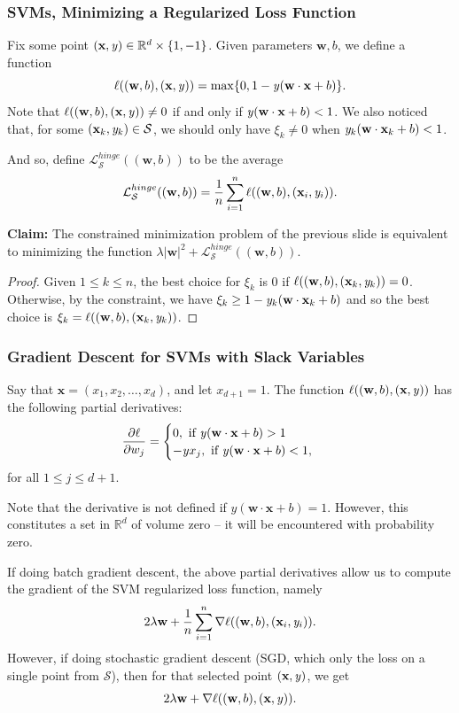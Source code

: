 \documentclass[smaller]{beamer}
\theoremstyle{example}
\newcommand{\x}{\textbf{x}}
\newcommand{\ix}[1]{{\it #1}}
\begin{document}
\begin{frame}
    \frametitle{SVMs, Minimizing a Regularized Loss Function}
    Fix some point $(\x, \ix y)\in\mathbb R^{d}\times\{1,-1\}$. Given parameters $\textbf{w},b$, we define a function 
        \[\ell((\textbf{w}, b), (\x, \ix y)) = \max\{0, 1 - \ix y(\textbf{w}\cdot\x + b)\}.\]
    \pause
    Note that $\ell((\textbf{w}, b), (\x, \ix y)) \ne 0$ if and only if $\ix y(\textbf{w}\cdot\x + b) < 1$. We also noticed that, for some $(\x_k,\ix y_k)\in\mathcal S$, we should only have $\xi_k\ne 0$ when $\ix y_k(\textbf{w}\cdot\x_k + b) < 1$. 
    
    \pause
    And so, define $\mathcal L_{\mathcal S}^{hinge}((\textbf{w}, b))$ to be the average
        \[\mathcal L_{\mathcal S}^{hinge}((\textbf{w}, b)) = \frac{1}{n}\sum_{i=1}^n\ell((\textbf{w}, b), (\x_i, \ix y_i)).\]
    
    \pause
    \textbf{Claim:} The constrained minimization problem of the previous slide is equivalent to minimizing the function $\lambda|\textbf{w}|^2 + \mathcal L_{\mathcal S}^{hinge}((\textbf{w},b))$.
    \pause
    \begin{proof}Given $1\le k\le n$, the best choice for $\xi_k$ is $0$ if $\ell((\textbf{w}, b), (\x_k, \ix y_k)) = 0$. Otherwise, by the constraint, we have $\xi_k \ge 1 - \ix y_k(\textbf{w}\cdot\x_k + b)$ and so the best choice is $\xi_k = \ell((\textbf{w}, b), (\x_k, \ix y_k))$.
    \end{proof}
\end{frame}

\begin{frame}
    \frametitle{Gradient Descent for SVMs with Slack Variables}
    Say that $\x = (x_1,x_2,\ldots,x_d)$, and let $x_{d+1}=1$. The function $\ell((\textbf{w}, b), (\x, \ix y))$ has the following partial derivatives: 
        \begin{align*}
            \frac{\partial\ell}{\partial w_j} &= \begin{cases}0,\ \text{if}\ \ix y(\textbf{w}\cdot\x+b) > 1 \\ 
                                                    -\ix y x_j,\ \text{if}\ \ix y(\textbf{w}\cdot\x+b) < 1,
                                                \end{cases}
        \end{align*}
        for all $1\le j\le d+1$. 
        
        \pause
        Note that the derivative is not defined if $y(\textbf{w}\cdot\x+b) = 1$. However, this constitutes a set in $\mathbb R^d$ of volume zero {--} it will be encountered with probability zero.

        \pause
        If doing batch gradient descent, the above partial derivatives allow us to compute the gradient of the SVM regularized loss function, namely 
            \[2\lambda\textbf{w} + \frac{1}{n}\sum_{i=1}^n\nabla\ell((\textbf{w},b),(\x_i, \ix y_i)).\]
        \pause
        However, if doing stochastic gradient descent (SGD, which only the loss on a single point from $\mathcal S$), then for that selected point $(\x,\ix y)$, we get 
            \[2\lambda\textbf{w} + \nabla\ell((\textbf{w},b),(\x, \ix y)).\]
\end{frame}
\end{document}
